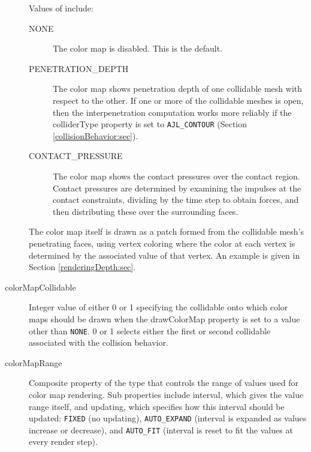 \begin{description}
Values of
include:

\begin{description}

\item[NONE]\mbox{}

The color map is disabled. This is the default.

\item[PENETRATION\_DEPTH]\mbox{}

The color map shows penetration depth of one collidable mesh with
respect to the other. If one or more of the collidable meshes is open,
then the interpenetration computation works more reliably if the {\sf
colliderType} property is set to {\tt AJL\_CONTOUR} (Section
\ref{collisionBehavior:sec}).

\item[CONTACT\_PRESSURE]\mbox{}

The color map shows the contact pressures over the contact region.
Contact pressures are determined by examining the impulses at the
contact constraints, dividing by the time step to obtain forces, and
then distributing these over the surrounding faces.  

\end{description}

The color map itself is drawn as a patch formed from the collidable
mesh's penetrating faces, using vertex coloring where the color at
each vertex is determined by the associated value of that vertex.  An
example is given in Section \ref{renderingDepth:sec}.

\item[colorMapCollidable]

Integer value of either 0 or 1 specifying the collidable onto which color
maps should be drawn when the {\sf drawColorMap} property is set to a
value other than {\tt NONE}. 0 or 1 selects either the first or second
collidable associated with the collision behavior.

\item[colorMapRange]\mbox{}

Composite property of the type
 that controls the range
of values used for color map rendering. Sub properties include {\sf
interval}, which gives the value range itself, and {\sf updating},
which specifies how this interval should be updated: {\tt FIXED} (no
updating), {\tt AUTO\_EXPAND} (interval is expanded as values increase
or decrease), and {\tt AUTO\_FIT} (interval is reset to fit the values
at every render step).

\end{description}

